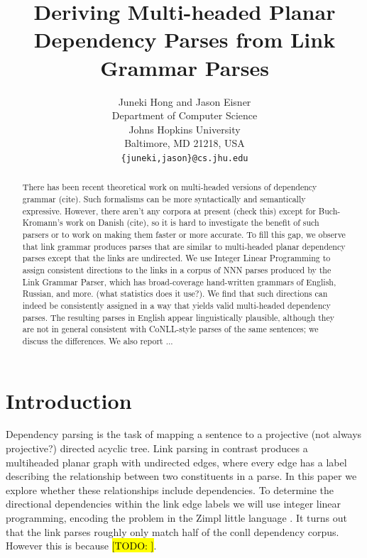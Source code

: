 \documentclass[11pt]{article}
\title{Deriving Multi-headed Planar Dependency Parses from Link Grammar Parses}
\author{Juneki Hong and Jason Eisner\\
  Department of Computer Science \\
  Johns Hopkins University \\
  Baltimore, MD 21218, USA \\ 
  {\tt \{juneki,jason\}@cs.jhu.edu} \\
}
\date{}
\newcommand{\Note}[1]{}
\renewcommand{\Note}[1]{\hl{[#1]}}  %
\newcommand{\TODO}[1]{\Note{TODO: #1}}
\begin{document}
\maketitle

\begin{abstract}

There has been recent theoretical work on multi-headed versions of dependency grammar (cite). Such formalisms can be more syntactically and semantically expressive. However, there aren't any corpora at present (check this) except for Buch-Kromann's work on Danish (cite), so it is hard to investigate the benefit of such parsers or to work on making them faster or more accurate. To fill this gap, we observe that link grammar produces parses that are similar to multi-headed planar dependency parses except that the links are undirected. We use Integer Linear Programming to assign consistent directions to the links in a corpus of NNN parses produced by the Link Grammar Parser, which has broad-coverage hand-written grammars of English, Russian, and more. (what statistics does it use?). We find that such directions can indeed be consistently assigned in a way that yields valid multi-headed dependency parses. The resulting parses in English appear linguistically plausible, although they are not in general consistent with CoNLL-style parses of the same sentences; we discuss the differences. We also report ...

\end{abstract}



\section{Introduction}


Dependency parsing is the task of mapping a sentence to a projective (not always projective?) directed acyclic tree. Link parsing in contrast produces a multiheaded planar graph with undirected edges, where every edge has a label describing the relationship between two constituents in a parse. In this paper we explore whether these relationships include dependencies. To determine the directional dependencies within the link edge labels we will use integer linear programming, encoding the problem in the Zimpl little language \cite{Koch2004}. It turns out that the link parses roughly only match half of the conll dependency corpus. However this is because \TODO{}. 

\end{document}
